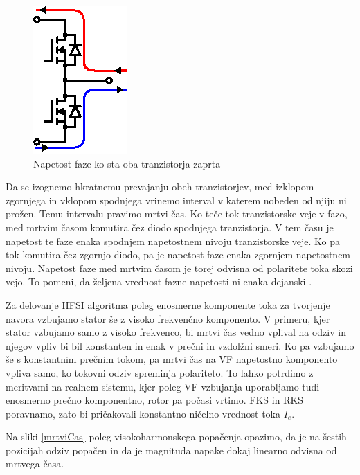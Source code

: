 \documentclass[a4paper,twoside,openright,12pt,slovene]{book}
\begin{document}
\begin{figure}[!htbp]
    \centering
    \includegraphics[width=0.4\columnwidth]{Slike/Inkscape/mrtviCasRazlaga.eps}
    \caption{\label{mrtviCasRazlaga} Napetost faze ko sta oba tranzistorja zaprta}
\end{figure}

Da se izognemo hkratnemu prevajanju obeh tranzistorjev, med izklopom zgornjega in vklopom spodnjega vrinemo interval v katerem nobeden od njiju ni
prožen. Temu intervalu pravimo mrtvi čas. Ko teče tok tranzistorske veje v fazo, med mrtvim časom komutira čez diodo spodnjega tranzistorja. V tem času je napetost te faze enaka spodnjem napetostnem
nivoju tranzistorske veje. Ko pa tok komutira čez zgornjo diodo, pa je napetost faze enaka zgornjem napetostnem nivoju. Napetost faze med mrtvim časom je torej odvisna od polaritete toka skozi vejo.
To pomeni, da željena vrednost fazne napetosti ni enaka dejanski \cite{ambrovzivc2016elektrivcni}. 

Za delovanje HFSI algoritma poleg enosmerne komponente toka za tvorjenje navora vzbujamo stator še z visoko frekvenčno komponento. V primeru, kjer stator vzbujamo samo z visoko frekvenco, bi mrtvi čas
vedno vplival na odziv in njegov vpliv bi bil konstanten in enak v prečni in vzdolžni smeri. Ko pa vzbujamo še s konstantnim prečnim tokom, pa mrtvi čas na VF napetostno komponento vpliva samo, ko
tokovni odziv spreminja polariteto. To lahko potrdimo z meritvami na realnem sistemu, kjer poleg VF vzbujanja uporabljamo tudi enosmerno prečno komponentno, rotor pa počasi vrtimo. FKS in RKS
poravnamo, zato bi pričakovali konstantno ničelno vrednost toka $I_e$.

Na sliki \ref{mrtviCas} poleg visokoharmonskega popačenja opazimo, da je na šestih pozicijah odziv popačen in da je magnituda napake dokaj linearno odvisna od mrtvega časa.
\end{document}
